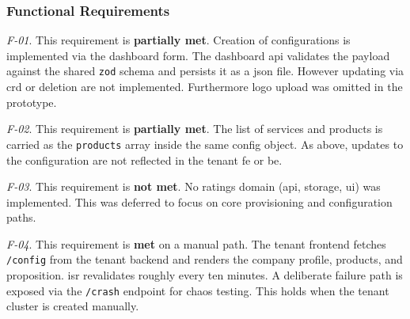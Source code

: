 \documentclass[11pt, a4paper, oneside, listof=totoc]{scrartcl}
\begin{document}
            \subsubsection{Functional Requirements}\label{subsubsec:evalFunctionalRequirements}
                \begin{enumerate}[label={[\arabic*]:},
                    ref=Challenge~\arabic*,
                    leftmargin=*,
                    itemsep=0.6\baselineskip]

                    \item\label{chal:evalF01}
                        \textit{F-01}.
                        This requirement is \textbf{partially met}.
                        Creation of configurations is implemented via the dashboard form.
                        The dashboard \gls{api} validates the payload against the shared
                        \texttt{zod} schema and persists it as a \gls{json} file.
                        However updating via \gls{crd} or deletion are not implemented.
                        Furthermore logo upload was omitted in the prototype.

                    \item\label{chal:evalF02}
                        \textit{F-02}.
                        This requirement is \textbf{partially met}.
                        The list of services and products is carried as the \texttt{products} array
                        inside the same config object.
                        As above, updates to the configuration are not reflected in the tenant
                        \gls{fe} or \gls{be}.

                    \item\label{chal:evalF03}
                        \textit{F-03}.
                        This requirement is \textbf{not met}.
                        No ratings domain (\gls{api}, storage, \gls{ui}) was implemented.
                        This was deferred to focus on core provisioning and configuration paths.

                    \item\label{chal:evalF04}
                        \textit{F-04}.
                        This requirement is \textbf{met} on a manual path.
                        The tenant frontend fetches \texttt{/config} from the tenant backend and
                        renders the company profile, products, and proposition.
                        \gls{isr} revalidates roughly every ten minutes.
                        A deliberate failure path is exposed via the \texttt{/crash} endpoint for
                        chaos testing.
                        This holds when the tenant cluster is created manually.


\end{enumerate}
\end{document}
